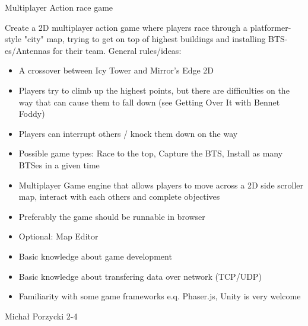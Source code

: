 \begin{project}
{Multiplayer Action race game}
{
Create a 2D multiplayer action game where players race through a platformer-style "city" map, trying to get on top of highest buildings and installing BTS-es/Antennas for their team. General rules/ideas:
\begin{itemize}
	\item A crossover between Icy Tower and Mirror's Edge 2D
	\item Players try to climb up the highest points, but there are difficulties on the way that can cause them to fall down (see Getting Over It with Bennet Foddy)
	\item Players can interrupt others / knock them down on the way
	\item Possible game types: Race to the top, Capture the BTS, Install as many BTSes in a given time
\end{itemize}
}
{
\begin{itemize}
	\item Multiplayer Game engine that allows players to move across a 2D side scroller map, interact with each others and complete objectives
	\item Preferably the game should be runnable in browser
	\item Optional: Map Editor
\end{itemize}
}
{
\begin{itemize}
	\item Basic knowledge about game development
	\item Basic knowledge about transfering data over network (TCP/UDP)
	\item Familiarity with some game frameworks e.q. Phaser.js, Unity is very welcome
\end{itemize}
}
{Michał Porzycki}
{2-4}
\end{project}
